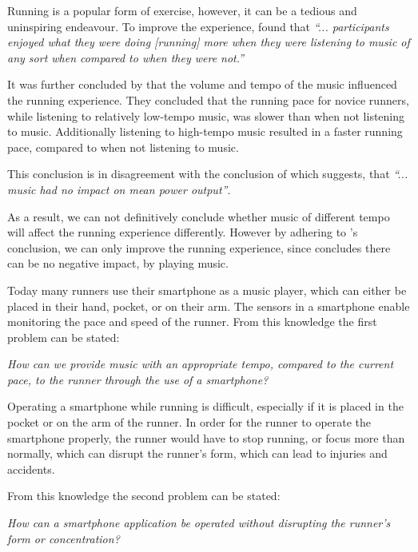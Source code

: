Running is a popular form of exercise, however, it can be a tedious and uninspiring endeavour.
To improve the experience, \citet{musicRunEffectArticle} found that 
\textit{``... participants enjoyed what they were doing [running] more when they were listening to music of any sort when compared to when they were not.''}

It was further concluded by \citet{musicRunEffectArticle} that the volume and tempo of the music influenced the running experience.
They concluded that the running pace for novice runners, while listening to relatively low-tempo music, was slower than when not listening to music. Additionally listening to high-tempo music resulted in a faster running pace, compared to when not listening to music.

This conclusion is in disagreement with the conclusion of \citet{musicNoPerformanceEffect} which suggests, that \textit{``... music had no impact on mean power output''}.

As a result, we can not definitively conclude whether music of different tempo will affect the running experience differently. 
However by adhering to \citet{musicRunEffectArticle}'s conclusion, we can only improve the running experience, since \citet{musicNoPerformanceEffect} concludes there can be no negative impact, by playing music.

Today many runners use their smartphone as a music player, which can either be placed in their hand, pocket, or on their arm.
The sensors in a smartphone enable monitoring the pace and speed of the runner.
From this knowledge the first problem can be stated:

\begin{center}
\textit{How can we provide music with an appropriate tempo, compared to the current pace, to the runner through the use of a smartphone?}
\end{center}

Operating a smartphone while running is difficult, especially if it is placed in the pocket or on the arm of the runner.
In order for the runner to operate the smartphone properly, the runner would have to stop running, or focus more than normally, which can disrupt the runner's form, which can lead to injuries and accidents.

From this knowledge the second problem can be stated: 

\begin{center}
\textit{How can a smartphone application be operated without disrupting the runner's form or concentration?}
\end{center}



